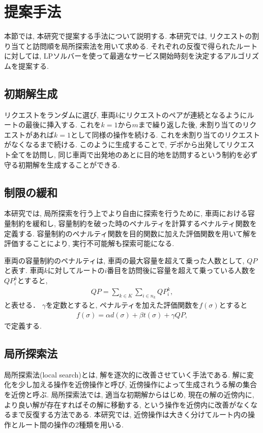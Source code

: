 \chapter{提案手法}\label{method}
本節では, 本研究で提案する手法について説明する. 本研究では, リクエストの割り当てと訪問順を局所探索法を用いて求める. それぞれの反復で得られたルートに対しては, LPソルバーを使って最適なサービス開始時刻を決定するアルゴリズムを提案する.
\section{初期解生成}
リクエストをランダムに選び, 車両$k$にリクエストのペアが連続となるようにルートの最後に挿入する. これを$k = 1 から m$まで繰り返した後, 未割り当てのリクエストがあれば$k = 1 $として同様の操作を続ける. これを未割り当てのリクエストがなくなるまで続ける.
このように生成することで, デポから出発してリクエスト全てを訪問し, 同じ車両で出発地のあとに目的地を訪問するという制約を必ず守る初期解を生成することができる.

\section{制限の緩和}
本研究では, 局所探索を行う上でより自由に探索を行うために, 車両における容量制約を緩和し, 容量制約を破った時のペナルティを計算するペナルティ関数を定義する. 容量制約のペナルティ関数を目的関数に加えた評価関数を用いて解を評価することにより, 実行不可能解も探索可能になる.

車両の容量制約のペナルティは, 車両の最大容量を超えて乗った人数として, $QP$と表す. 車両$k$に対してルートの$i$番目を訪問後に容量を超えて乗っている人数を$QP_i^k$とすると,
\begin{align*}
  QP = \sum_{k \in K}\sum_{i \in n_k} QP_i^k,
\end{align*}
と表せる．
$\gamma$を定数とすると, ペナルティを加えた評価関数を$f(\sigma)$とすると
\begin{align*}
  f(\sigma) = \alpha d(\sigma)+ \beta t(\sigma) + \gamma QP,
\end{align*}
で定義する.

\section{局所探索法}
局所探索法(local search)とは, 解を逐次的に改善させていく手法である. 解に変化を少し加える操作を近傍操作と呼び, 近傍操作によって生成されうる解の集合を近傍と呼ぶ. 局所探索法では, 適当な初期解からはじめ, 現在の解の近傍内に, より良い解が存在すればその解に移動する, という操作を近傍内に改善がなくなるまで反復する方法である. 本研究では, 近傍操作は大きく分けてルート内の操作とルート間の操作の2種類を用いる.

